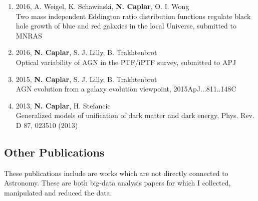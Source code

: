 \documentclass[11pt,letterpaper]{article}
\renewenvironment{itemize}{
  \begin{list}{}{
    \setlength{\leftmargin}{1.5em}
    \setlength{\itemsep}{0.15em}
    \setlength{\parskip}{0pt}
    \setlength{\parsep}{0.25em}
  }
}{
  \end{list}
}
\begin{document}
\begin{enumerate}
\item 2016, A. Weigel, K. Schawinski,  \textbf{N. Caplar}, O. I. Wong
\\    Two mass independent Eddington ratio distribution functions regulate black hole growth of blue and red 
galaxies in the local Universe, submitted to MNRAS \\

\item 2016,  \textbf{N. Caplar}, S. J. Lilly, B. Trakhtenbrot   \\Optical variability of AGN in the PTF/iPTF survey, submitted to APJ \\
 
\item 2015,  \textbf{N. Caplar}, S. J. Lilly, B. Trakhtenbrot  \\AGN evolution from a galaxy evolution viewpoint, 2015ApJ...811..148C \\
  
 \item 2013,  \textbf{N. Caplar}, H. Stefancic  \\ Generalized models of unification of dark matter and dark energy, Phys. Rev. D 87, 023510 (2013)   
\end{enumerate}
\newpage
%

\subsection*{Other Publications}

These publications include are works which are not directly connected to Astronomy. These are both big-data analysis papers for which I collected, manipulated and reduced the data.
\end{document}
